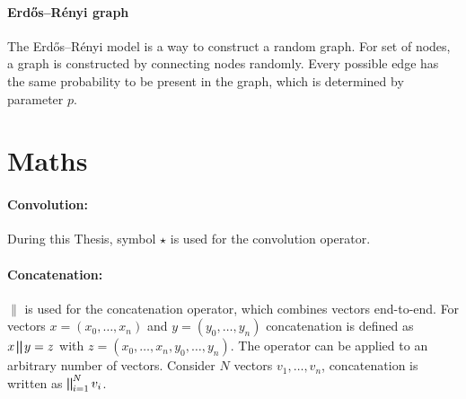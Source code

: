 \paragraph{Erdős–Rényi graph}
The Erdős–Rényi model is a way to construct a random graph.
For set of nodes, a graph is constructed by connecting nodes randomly. 
Every possible edge has the same probability to be present in the graph, which is determined by parameter $p$.
 
\section{Maths}
\paragraph{Convolution:}
During this Thesis, symbol $\star$ is used for the convolution operator.

\paragraph{Concatenation:}
$\parallel$ is used for the concatenation operator, which combines vectors end-to-end. 
For vectors $x=(x_0, \dots, x_n)$ and $y=(y_0, \dots, y_n)$ concatenation is defined as 
$ x \bigparallel y = z$ with $z=(x_0, \dots, x_n, y_0, \dots, y_n) $. 
The operator can be applied to an arbitrary number of vectors.
Consider $N$ vectors $v_1, \dots, v_n$, concatenation is written as  $\bigparallel^N_{i=1} v_i$.
